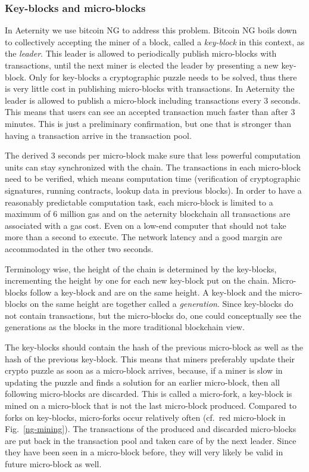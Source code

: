 \subsubsection{Key-blocks and micro-blocks}

In Aeternity we use bitcoin NG \cite{Eyal:2016:BSB:2930611.2930615} to
address this problem. Bitcoin NG boils down to collectively accepting the miner of a
block, called a \textit{key-block} in this context, as the
\textit{leader}. This leader is allowed to periodically publish micro-blocks with
transactions, until the next miner is elected the leader by presenting a
new key-block. Only for key-blocks a cryptographic puzzle needs to be
solved, thus there is very little cost in publishing micro-blocks with
transactions. In Aeternity the leader is allowed to publish a
micro-block including transactions every 3 seconds. This means that
users can see an accepted transaction much faster than after 3
minutes. This is just a preliminary confirmation, but one that is
stronger than having a transaction arrive in the transaction pool.

The derived 3 seconds per micro-block make sure that less powerful
computation units can stay synchronized with the chain. The
transactions in each micro-block need to be verified, which means
computation time (verification of cryptographic signatures, running
contracts, lookup data in previous blocks). In order to have a
reasonably predictable computation task, each micro-block is limited to
a maximum of 6 million gas and on the aeternity blockchain all
transactions are associated with a gas cost. Even on a low-end computer that should
not take more than a second to execute. The network latency and a good margin
are accommodated in the other two seconds.

Terminology wise, the height of the chain is determined by the
key-blocks, incrementing the height by one for each new key-block put
on the chain. Micro-blocks follow a key-block and are on the same
height. A key-block and the micro-blocks on the same height are
together called a \textit{generation}. Since key-blocks do not contain
transactions, but the micro-blocks do, one could conceptually see the
generations as the blocks in the more traditional blockchain view.

The key-blocks should contain the hash of the previous micro-block as
well as the hash of the previous key-block. This means that miners
preferably update their crypto puzzle as soon as a micro-block
arrives, because, if a miner is slow in updating the puzzle and finds a solution for an earlier
micro-block, then all following micro-blocks are discarded. This is
called a micro-fork, a key-block is mined on a micro-block that is not
the last micro-block produced. Compared to forks on key-blocks,
micro-forks occur relatively often (cf.\ red micro-block in Fig.\ \ref{ng-mining}). The
transactions of the produced and discarded micro-blocks are put back in the
transaction pool and taken care of by the next leader. Since they have
been seen in a micro-block before, they will very likely be valid in
future micro-block as well.

